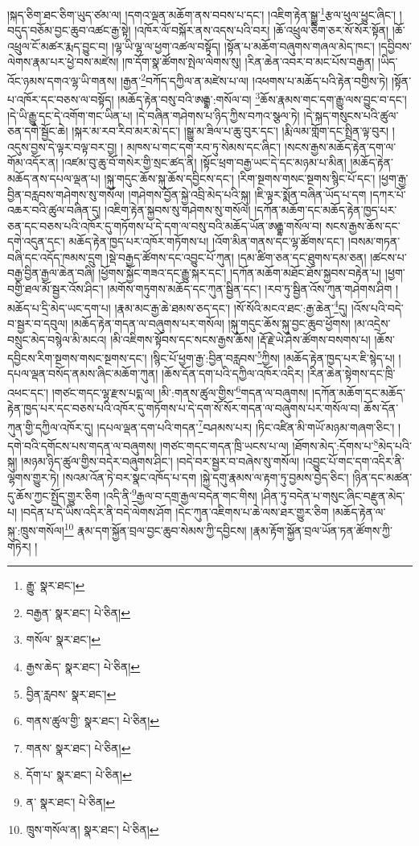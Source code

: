 །སྐད་ཅིག་ཐང་ཅིག་ཡུད་ཙམ་ལ། །དགའ་ལྡན་མཆོག་ནས་བབས་པ་དང་། །འཇིག་རྟེན་སྒྱུ་\footnote{རྒྱུ་  སྣར་ཐང་། }རྩལ་ཕུལ་ཕྱུང་ཞིང་། །བདུད་བཅོམ་བྱང་ཆུབ་འཚང་རྒྱ་སྟེ། །འཁོར་ལོ་བསྐོར་ནས་འདས་པའི་བར། །ཆོ་འཕྲུལ་ཅིག་ཅར་སོ་སོར་སྟོན། །ཆོ་འཕྲུལ་ངོ་མཚར་རྨད་བྱུང་བ། །ལྷ་ཡི་ལྷ་ལ་ཕྱག་འཚལ་བསྟོད། །སྟོན་པ་མཆོག་བཞུགས་གཞལ་མེད་ཁང་། །དབྱིབས་ལེགས་རྣམ་པར་ཕྱེ་བས་མཛེས། །ཁ་དོག་སྣ་ཚོགས་སྤེལ་ལེགས་སུ། །རིན་ཆེན་འབར་བ་མང་པོས་བརྒྱན། །ཡིད་འོང་ཉམས་དགའ་ལྷ་ཡི་གནས། །རྒྱན་\footnote{བརྒྱན་  སྣར་ཐང་།  པེ་ཅིན། }བཀོད་དཀྱིལ་ན་མཛེས་པ་ལ། །འཕགས་པ་མཆོད་པའི་རྟེན་བགྱིས་ཏེ། །སྟོན་པ་འཁོར་དང་བཅས་ལ་བསྟོད། །མཆོད་རྟེན་བསུ་བའི་ཨརྒྷ་:གསོལ་བ། \footnote{གསོལ་  སྣར་ཐང་། }ཆོས་རྣམས་གང་དག་རྒྱུ་ལས་བྱུང་བ་དང་། །དེ་ཡི་རྒྱུ་དང་དེ་འགོག་གང་ཡིན་པ། །དེ་བཞིན་གཤེགས་པ་ཉིད་ཀྱིས་བཀའ་སྩལ་ཏེ། །དེ་སྐད་གསུངས་པའི་ཚུལ་ཅན་དགེ་སྦྱོང་ཆེ། །སྐར་མ་རབ་རིབ་མར་མེ་དང་། །སྒྱུ་མ་ཟིལ་པ་ཆུ་བུར་དང་། །རྨི་ལམ་གློག་དང་སྤྲིན་ལྟ་བུར། །འདུས་བྱས་དེ་ལྟར་བལྟ་བར་བྱ། །
མཁས་པ་གང་དག་རབ་ཏུ་སེམས་དང་ཞིང་། །སངས་རྒྱས་མཆོད་རྟེན་དག་ལ་གོམ་འདོར་ན། །འཛམ་བུ་ཆུ་བོ་གསེར་གྱི་སྲང་ཚད་ནི། །སྟོང་ཕྲག་བརྒྱ་ཡང་དེ་དང་མཉམ་པ་མིན། །མཆོད་རྟེན་མཆོད་ནས་དཔལ་ལྡན་པ། །སྐུ་གདུང་ཆོས་སྐུ་ཆོས་དབྱིངས་དང་། །རིག་སྔགས་གསང་སྔགས་སྙིང་པོ་དང་། །ཕྱག་རྒྱ་བྱིན་བརླབས་གཤེགས་སུ་གསོལ། །གཤེགས་བྱོན་སྐྱེ་འབྲི་མེད་པའི་སྐུ། །ཇི་ལྟར་སྨོན་བཞིན་ཡོད་པ་དག །དཀར་པོ་འཆར་བའི་ཚུལ་བཞིན་དུ། །འཇིག་རྟེན་སྐྱབས་སུ་གཤེགས་སུ་གསོལ། །དཀོན་མཆོག་དང་མཆོད་རྟེན་ཁྱད་པར་ཅན་དང་བཅས་པའི་འཁོར་དུ་གཏོགས་པ་དེ་དག་ལ་བསུ་བའི་མཆོད་ཡོན་ཨརྒྷ་གསོལ་བ། སངས་རྒྱས་ཆོས་དང་དགེ་འདུན་དང་། མཆོད་རྟེན་ཁྱད་པར་འཁོར་གཏོགས་པ། །འོག་མིན་གནས་དང་ལྷ་ཚོགས་དང་། །བསམ་གཏན་བཞི་དང་འདོད་ཁམས་དྲུག །སྡེ་བརྒྱད་ཚོགས་དང་འབྱུང་པོ་ཀུན། །དམ་ཚིག་ཅན་དང་ཐུགས་དམ་ཅན། །ཚངས་པ་བརྒྱ་བྱིན་རྒྱལ་ཆེན་བཞི། །ཕྱོགས་སྐྱོང་གཟའ་དང་རྒྱུ་སྐར་དང་། །དཀོན་མཆོག་མཐོང་ཐོས་སྐྱབས་བརྟེན་པ། །ཕྱག་བགྱི་ཐལ་མོ་སྦྱར་འོས་ཤིང་། །མགོས་གཏུགས་མཆོད་དང་ཀུན་སྦྱིན་དང་། །རབ་ཏུ་སྦྱིན་འོས་ཀུན་གཤེགས་ཤིག །མཆོད་པ་དྲི་མེད་ཡང་དག་པ། །རྣམ་མང་རྒྱ་ཆེ་ཐམས་ཅད་དང་། །སོ་སོའི་མངའ་ཐང་:རྒྱ་ཆེན་\footnote{རྒྱས་ཆེད་  སྣར་ཐང་།  པེ་ཅིན། }དུ། །འོས་པའི་བདེ་བ་སྦྱར་བ་དབུལ། །མཆོད་རྟེན་གདན་ལ་བཞུགས་པར་གསོལ། །སྐུ་གདུང་ཆོས་སྐུ་བྱང་ཆུབ་ཕྱོགས། །མ་འདྲེས་བསྲུང་མེད་བསྙེལ་མི་མངའ། །མི་འཇིགས་སྟོབས་དང་སངས་རྒྱས་ཆོས། །རྡོ་རྗེ་ཡེ་ཤེས་ཚོགས་བསགས་པ། །ཆོས་དབྱིངས་རིག་སྔགས་གསང་སྔགས་དང་། །སྙིང་པོ་ཕྱག་རྒྱ་:བྱིན་བརླབས་\footnote{བྱིན་རླབས་  སྣར་ཐང་། }ཀྱིས། །མཆོད་རྟེན་ཁྱད་པར་ཇི་སྙེད་པ། །དཔལ་ལྡན་བསོད་ནམས་ཞིང་མཆོག་ཀུན། །ཆོས་དོན་དག་པའི་དཀྱིལ་འཁོར་འདིར། །རིན་ཆེན་སྟེགས་དང་ཁྲི་འཕང་དང་། །གཙང་གདང་ལྷ་རྫས་པདྨ་ལ། །མི་:གནས་ཚུལ་གྱིས་\footnote{གནས་ཚུལ་གྱི་  སྣར་ཐང་།  པེ་ཅིན། }གདན་ལ་བཞུགས། །དཀོན་མཆོག་དང་མཆོད་རྟེན་ཁྱད་པར་དང་བཅས་པའི་འཁོར་དུ་གཏོགས་པ་དེ་དག་སོ་སོར་གདན་ལ་བཞུགས་པར་གསོལ་བ། ཆོས་དོན་ཀུན་གྱི་དཀྱིལ་འཁོར་དུ། །དཔལ་ལྡན་དག་པའི་གདན་\footnote{གནས་  སྣར་ཐང་།  པེ་ཅིན། }བཤམས་པར། །ཏིང་འཛིན་མི་གཡོ་མཉམ་གཞག་ཅིང་། །དགེ་བའི་དགོངས་པས་གདན་ལ་བཞུགས། །གཙང་གདང་གདན་ཁྲི་ཡངས་པ་ལ། །ཐོགས་མེད་:དོགས་པ་\footnote{དོག་པ་  སྣར་ཐང་།  པེ་ཅིན། }མེད་པའི་སྐུ། །མཉམ་ཉིད་ཚུལ་གྱིས་བདེར་བཞུགས་ཤིང་། །བདེ་བར་སྦྱར་བ་བཞེས་སུ་གསོལ། །འབྱུང་པོ་གང་དག་འདིར་ནི་ལྷགས་གྱུར་ཏེ། །སའམ་འོན་ཏེ་བར་སྣང་འཁོད་པ་དག །སྐྱེ་དགུ་རྣམས་ལ་རྟག་ཏུ་བྱམས་བྱེད་ཅིང་། །ཉིན་དང་མཚན་དུ་ཆོས་ཀྱང་སྤྱོད་གྱུར་ཅིག །འདི་ནི་\footnote{ན་  སྣར་ཐང་།  པེ་ཅིན། }རྒྱལ་བ་དགྲ་རྒྱལ་བདེན་གང་གིས། །ཤིན་ཏུ་བདེན་པ་གསུང་ཞིང་བརྫུན་མེད་པ། །བདེན་པ་དེ་ཡིས་འདིར་ནི་བདེ་ལེགས་ཤོག །དེང་ཀུན་འཇིགས་པ་ཆེ་ལས་ཐར་གྱུར་ཅིག །མཆོད་རྟེན་ལ་སྐུ་:ཁྲུས་གསོལ།\footnote{ཁྲུས་གསོལ་ན།  སྣར་ཐང་།  པེ་ཅིན། } རྣམ་དག་སྐྱོན་བྲལ་བྱང་ཆུབ་སེམས་ཀྱི་དབྱིངས། །རྣམ་རྟོག་སྐྱོན་བྲལ་ཡོན་ཏན་ཚོགས་ཀྱི་གཏེར། །
